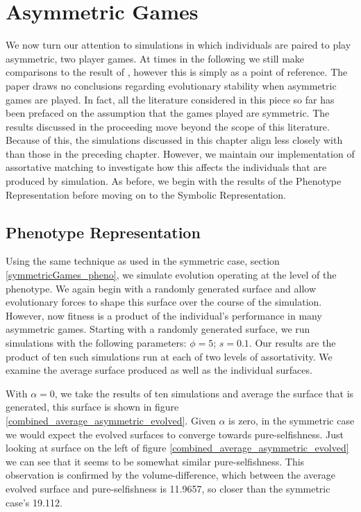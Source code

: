 \documentclass[11pt]{book}
\newcommand*{\np}{\par\noindent\newline}
\begin{document}
\chapter{Asymmetric Games}\label{asymmetricGames}
We now turn our attention to simulations in which individuals are paired to play asymmetric, two player games.
At times in the following we still make comparisons to the result of \citet{alger_generalization_2012}, however this is simply as a point of reference.
The \citeauthor{alger_generalization_2012} paper draws no conclusions regarding evolutionary stability when asymmetric games are played.
In fact, all the literature considered in this piece so far has been prefaced on the assumption that the games played are symmetric.
The results discussed in the proceeding move beyond the scope of this literature. 
Because of this, the simulations discussed in this chapter align less closely with \citet{alger_generalization_2012} than those in the preceding chapter.
However, we maintain our implementation of assortative matching to investigate how this affects the individuals that are produced by simulation.
As before, we begin with the results of the Phenotype Representation before moving on to the Symbolic Representation.


\section{Phenotype Representation}\label{asymmetricGames_pheno}
Using the same technique as used in the symmetric case, section \ref{symmetricGames_pheno}, we simulate evolution operating at the level of the phenotype.
We again begin with a randomly generated surface and allow evolutionary forces to shape this surface over the course of the simulation.
However, now fitness is a product of the individual's performance in many asymmetric games.
Starting with a randomly generated surface, we run simulations with the following parameters: $\phi = 5$; $s = 0.1$.
Our results are the product of ten such simulations run at each of two levels of assortativity.
We examine the average surface produced as well as the individual surfaces.

\np With $\alpha = 0$, we take the results of ten simulations and average the surface that is generated, this surface is shown in figure \ref{combined_average_asymmetric_evolved}.
Given $\alpha$ is zero, in the symmetric case we would expect the evolved surfaces to converge towards pure-selfishness.
Just looking at surface on the left of figure \ref{combined_average_asymmetric_evolved} we can see that it seems to be somewhat similar pure-selfishness.
This observation is confirmed by the volume-difference, which between the average evolved surface and pure-selfishness is 11.9657, so closer than the symmetric case's 19.112.
\end{document}
